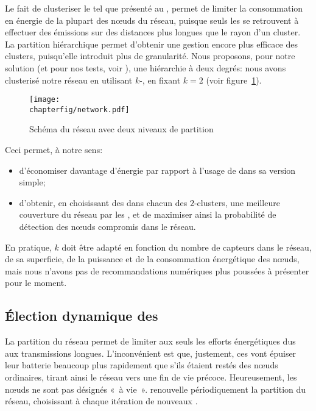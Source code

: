     Le fait de clusteriser le \rc tel que présenté au ,  permet de limiter la consommation en énergie de la plupart des nœuds du réseau, puisque seuls les \chs se retrouvent à effectuer des émissions sur des distances plus longues que le rayon d'un cluster.
La partition hiérarchique permet d'obtenir une gestion encore plus efficace des clusters, puisqu'elle introduit plus de granularité.
Nous proposons, pour notre solution (et pour nos tests, voir ), une hiérarchie à deux degrés: nous avons clusterisé notre réseau en utilisant $k$-\leach, en fixant $k=2$ (voir figure~\ref{sa:fig:network}).
\begin{figure}[ht]
    \centering
    \texttt{[image: \\chapterfig/network.pdf]}
    \caption{Schéma du réseau avec deux niveaux de partition}\label{sa:fig:network}
\end{figure}
Ceci permet, à notre sens:
\begin{itemize}
    \item d'économiser davantage d'énergie par rapport à l'usage de \leach dans sa version simple;
    \item d'obtenir, en choisissant des \cns dans chacun des $2$-clusters, une meilleure couverture du réseau par les \cns, et de maximiser ainsi la probabilité de détection des nœuds compromis dans le réseau.
\end{itemize}
En pratique, $k$ doit être adapté en fonction du nombre de capteurs dans le réseau, de sa superficie, de la puissance et de la consommation énergétique des nœuds, mais nous n'avons pas de recommandations numériques plus poussées à présenter pour le moment.

    \subsection{Élection dynamique des \cns}

La partition du réseau permet de limiter aux seuls \chs les efforts énergétiques dus aux transmissions longues.
L'inconvénient est que, justement, ces \CH vont épuiser leur batterie beaucoup plus rapidement que s'ils étaient restés des nœuds ordinaires, tirant ainsi le réseau vers une fin de vie précoce.
Heureusement, les nœuds ne sont pas désignés \CH «~à vie~».
\leach renouvelle périodiquement la partition du réseau, choisissant à chaque itération de nouveaux \chs.

